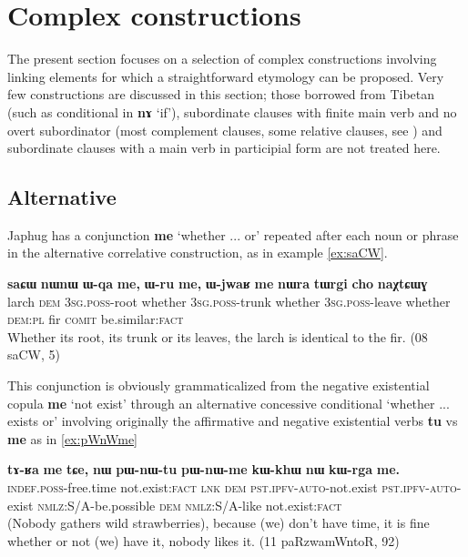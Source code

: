 \documentclass[oldfontcommands,oneside,a4paper,11pt]{article}
\newcommand{\ipa}[1]{\mbox{\phon\textbf{#1}}} %
\begin{document}
\section{Complex constructions} 
The present section focuses on a selection of complex constructions involving linking elements for which a straightforward etymology can be proposed.  Very few constructions are discussed in this section; those borrowed from Tibetan (such as conditional in \ipa{nɤ} `if'), subordinate clauses with finite main verb and no overt subordinator   (most complement clauses, some relative clauses, see \citealt{jacques16relatives}) and subordinate clauses with a main verb in participial form are not treated here.

\subsection{Alternative}
 Japhug has a conjunction \ipa{me}  `whether ... or' repeated after each noun or phrase in the alternative correlative construction, as in example \ref{ex:saCW}.
 
\begin{exe}
\ex \label{ex:saCW}
\gll  \ipa{saɕɯ} 	\ipa{nɯnɯ} 	\ipa{ɯ-qa} 	\ipa{me,} 	\ipa{ɯ-ru} 	\ipa{me,} 	\ipa{ɯ-jwaʁ} 	\ipa{me} 	\ipa{nɯra} 	\ipa{tɯrgi} 	\ipa{cho} 	\ipa{naχtɕɯɣ} \\
 larch \textsc{dem} \textsc{3sg.poss}-root whether \textsc{3sg.poss}-trunk whether \textsc{3sg.poss}-leave whether \textsc{dem:pl} fir  \textsc{comit} be.similar:\textsc{fact} \\
\glt Whether its root, its trunk or its leaves, the larch is identical to the fir. (08 saCW, 5)
\end{exe} 

This conjunction is obviously grammaticalized from the negative existential copula \ipa{me} `not exist' through an alternative  concessive conditional `whether ... exists or' involving originally the affirmative and negative existential verbs \ipa{tu} vs \ipa{me} as in \ref{ex:pWnWme}

\begin{exe}
\ex \label{ex:pWnWme}
\gll \ipa{tɤ-ʁa} 	\ipa{me} 	\ipa{tɕe,} 	\ipa{nɯ} 	\ipa{pɯ-nɯ-tu} 	\ipa{pɯ-nɯ-me} 	\ipa{kɯ-khɯ} 	\ipa{nɯ} 	\ipa{kɯ-rga} 	\ipa{me.} \\
\textsc{indef.poss}-free.time not.exist:\textsc{fact} \textsc{lnk} \textsc{dem} \textsc{pst.ipfv-auto}-not.exist \textsc{pst.ipfv-auto}-exist \textsc{nmlz}:S/A-be.possible \textsc{dem} \textsc{nmlz}:S/A-like not.exist:\textsc{fact} \\
\glt (Nobody gathers wild strawberries), because (we) don't have time, it is fine whether or not (we) have it, nobody likes it. (11 paRzwamWntoR, 92)
\end{exe}
 
\end{document}
